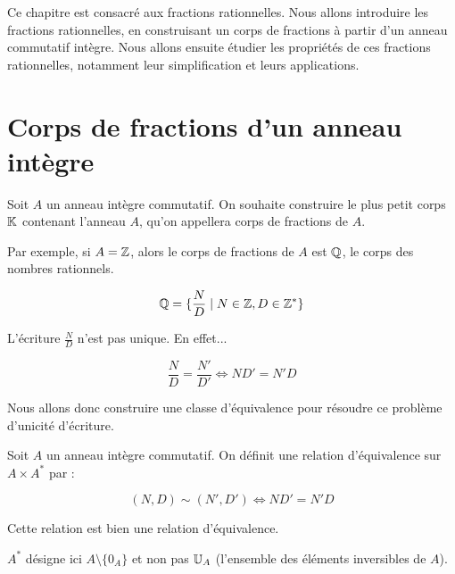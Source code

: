 \documentclass[12pt, a4paper]{report}
\begin{document}

\tableofcontents
\clearpage

\vspace*{\fill}
Ce chapitre est consacré aux fractions rationnelles. Nous allons introduire les fractions rationnelles, en construisant un corps de fractions à partir d'un anneau commutatif intègre. Nous allons ensuite étudier les propriétés de ces fractions rationnelles, notamment leur simplification et leurs applications.
\vspace*{\fill}

\chapter{Corps de fractions d'un anneau intègre}

Soit $A$ un anneau intègre commutatif. On souhaite construire le plus petit corps $\mathbb{K}$ contenant l'anneau $A$, qu'on appellera corps de fractions de $A$.

\begin{example}
    Par exemple, si $A = \mathbb{Z}$, alors le corps de fractions de $A$ est $\mathbb{Q}$, le corps des nombres rationnels.

    $$\mathbb{Q} = \{\frac{N}{D} \mid N \in \mathbb{Z}, D \in \mathbb{Z}^* \}$$

    L'écriture $\frac ND$ n'est pas unique. En effet...

    $$\frac ND = \frac{N'}{D'} \iff ND' = N'D$$
\end{example}

Nous allons donc construire une classe d'équivalence pour résoudre ce problème d'unicité d'écriture.

\begin{property}
    Soit $A$ un anneau intègre commutatif. On définit une relation d'équivalence sur $A \times A^*$ par :

    $$(N, D) \sim (N', D') \iff ND' = N'D$$

    Cette relation est bien une relation d'équivalence.
\end{property}

\begin{attention}
    $A^*$ désigne ici $A\setminus\{0_A\}$ et non pas $\mathbb{U}_A$ (l'ensemble des éléments inversibles de $A$).
\end{attention}
\end{document}
